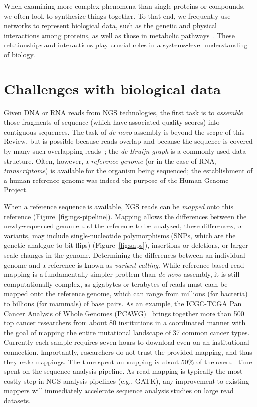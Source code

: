 \documentclass{acm_proc_article-sp}
\begin{document}
When examining more complex phenomena than single proteins or compounds, we
often look to synthesize things together.
To that end, we frequently use
networks to represent biological data, such as the genetic
and physical interactions among proteins, as well as those in metabolic 
pathways~\cite{berger2013computational}.
These relationships and interactions play crucial roles in a systems-level understanding of biology.

\section{Challenges with biological data}

Given DNA or RNA reads from NGS technologies, the first task is to 
\emph{assemble} those fragments of sequence (which have associated quality 
scores) into contiguous sequences.
The task of \emph{de novo} assembly is beyond the scope of this Review, but is
possible because reads overlap and because the sequence is covered by many such
overlapping reads~\cite{berger2013computational}; the \emph{de Bruijn graph} is a 
commonly-used data structure.
Often, however, a \emph{reference genome} (or in the case of RNA, 
\emph{transcriptome}) is available for the organism being sequenced; the
establishment of a human reference genome was indeed the purpose of the Human
Genome Project.

When a reference sequence is available, NGS reads can be \emph{mapped} onto
this reference (Figure~\ref{fig:ngs-pipeline}).
Mapping allows the differences between the newly-sequenced genome and the 
reference to be analyzed; these differences, or variants, may include single-nucleotide polymorphisms
(SNPs, which are the genetic analogue to bit-flips) (Figure~\ref{fig:snps}), 
insertions or deletions, or larger-scale changes in the genome.
Determining the differences between an individual genome and a reference is
known as \emph{variant calling}.
While reference-based read mapping is a fundamentally simpler problem than
\emph{de novo} assembly, it is still computationally complex, as gigabytes or
terabytes of reads must each be mapped onto the reference genome, which can 
range from millions (for bacteria) to billions (for mammals) of base pairs.
As an example, the ICGC-TCGA Pan Cancer Analysis of Whole Genomes 
(PCAWG)~\cite{weinstein2013cancer} brings together more than 500 top cancer 
researchers from about 80 institutions in a coordinated manner with the goal of 
mapping the entire mutational landscape of 37 common cancer types. 
Currently each sample requires seven hours to download even on an institutional 
connection. 
Importantly, researchers do not trust the provided mapping, and thus they redo mappings. 
The time spent on mapping is about 50\% of the overall time spent on the sequence analysis pipeline. 
As read mapping is typically the most costly step in NGS analysis pipelines (e.g., GATK), any improvement to existing mappers will immediately accelerate sequence analysis studies on large read datasets.
\end{document}
